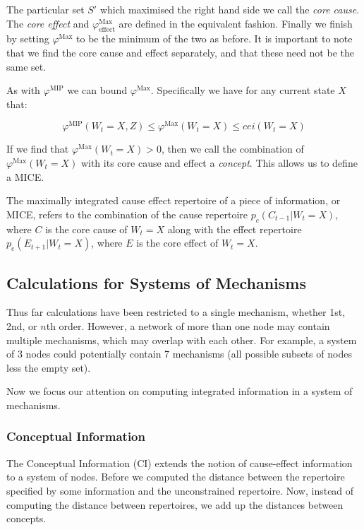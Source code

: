 The particular set $S'$ which maximised the right hand side we call the \textit{core cause}. The \textit{core effect} and $\varphi^{\text{Max}}_{\text{effect}}$ are defined in the equivalent fashion. Finally we finish  by setting $\varphi^{\text{Max}}$ to be the minimum of the two as before. It is important to note that we find the core cause and effect separately, and that these need not be the same set.

As with $\varphi^{\text{MIP}}$ we can bound $\varphi^{\text{Max}}$. Specifically we have for any current state $X$ that:

\begin{equation}
\label{eq:bound_phimax}
\varphi^{\text{MIP}}(W_t = X, Z) \leq \varphi^{\text{Max}}(W_t = X)\leq cei(W_t = X)
\end{equation}

If we find that $\varphi^{\text{Max}}(W_t = X)>0$, then we call the combination of $\varphi^{\text{Max}}(W_t = X)$ with its core cause and effect a \textit{concept}. This allows us to define a MICE.

\begin{definition}
	{The maximally integrated cause effect repertoire of a piece of information, or MICE, refers to the combination of the cause repertoire $p_c(C_{t-1}|W_t = X)$, where $C$ is the core cause of $W_t=X$ along with the effect repertoire $p_e(E_{t+1}|W_t = X)$, where $E$ is the core effect of $W_t = X$.}
\end{definition}

\subsection{Calculations for Systems of Mechanisms}
Thus far calculations have been restricted to a single mechanism, whether 1st, 2nd, or $n$th order. However, a network of more than one node may contain multiple mechanisms, which may overlap with each other. For example, a system of 3 nodes could potentially contain 7 mechanisms (all possible subsets of nodes less the empty set).

Now we focus our attention on computing integrated information in a system of mechanisms. 

\subsubsection{Conceptual Information}
\label{sec:CI}
The Conceptual Information (CI) extends the notion of cause-effect information to a system of nodes. Before we computed the distance between the repertoire specified by some information and the unconstrained repertoire. Now, instead of computing the distance between repertoires, we add up the distances between concepts.

